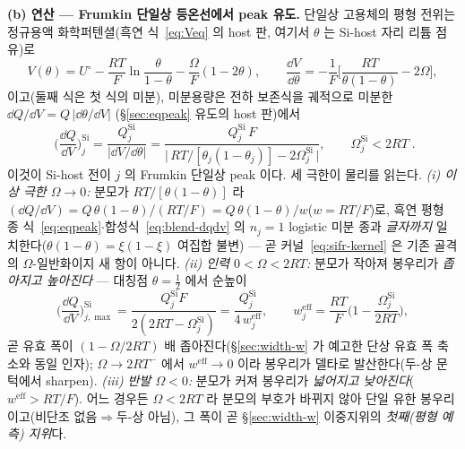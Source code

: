 \textbf{(b) 연산 --- Frumkin 단일상 등온선에서 peak 유도.}
단일상 고용체의 평형 전위는 정규용액 화학퍼텐셜(흑연 식~\eqref{eq:Veq} 의 host 판, 여기서 $\theta$ 는 Si-host
자리 리튬 점유)로
\begin{equation}
V(\theta)=U^{\circ}-\frac{RT}{F}\ln\frac{\theta}{1-\theta}-\frac{\Omega}{F}(1-2\theta),
\qquad
\frac{\dd V}{\dd\theta}=-\frac1F\Big[\frac{RT}{\theta(1-\theta)}-2\Omega\Big],
\label{eq:sifr-Vtheta}
\end{equation}
이고(둘째 식은 첫 식의 미분), 미분용량은 전하 보존식을 궤적으로 미분한 $\dd Q/\dd V=Q\,|\dd\theta/\dd V|$
(\S\ref{sec:eqpeak} 유도의 host 판)에서
\begin{equation}
\boxed{\;\Big(\frac{\dd Q}{\dd V}\Big)^\mathrm{Si}_j
=\frac{Q_j^\mathrm{Si}}{|\dd V/\dd\theta|}
=\frac{Q_j^\mathrm{Si}\,F}{\big|\,RT/[\theta_j(1-\theta_j)]-2\Omega_j^\mathrm{Si}\,\big|},
\qquad \Omega_j^\mathrm{Si}<2RT\;.}
\label{eq:sifr-kernel}
\end{equation}
이것이 Si-host 전이 $j$ 의 Frumkin 단일상 peak 이다. 세 극한이 물리를 읽는다.
\emph{(i) 이상 극한 $\Omega\!\to\!0$:} 분모가 $RT/[\theta(1-\theta)]$ 라
$(\dd Q/\dd V)=Q\,\theta(1-\theta)/(RT/F)=Q\,\theta(1-\theta)/w$($w\!=\!RT/F$)로, 흑연 평형 종
식~\eqref{eq:eqpeak}$\cdot$합성식~\eqref{eq:blend-dqdv} 의 $n_j\!=\!1$ logistic 미분 종과 \emph{글자까지}
일치한다($\theta(1-\theta)=\xi(1-\xi)$ 여집합 불변) --- 곧 커널~\eqref{eq:sifr-kernel} 은 기존 골격의
$\Omega$-일반화이지 새 항이 아니다. \emph{(ii) 인력 $0<\Omega<2RT$:} 분모가 작아져 봉우리가
\emph{좁아지고 높아진다} --- 대칭점 $\theta\!=\!\tfrac12$ 에서 순높이
\begin{equation}
\Big(\frac{\dd Q}{\dd V}\Big)^\mathrm{Si}_{j,\max}
=\frac{Q_j^\mathrm{Si}F}{2(2RT-\Omega_j^\mathrm{Si})}
=\frac{Q_j^\mathrm{Si}}{4\,w_j^\mathrm{eff}},\qquad
w_j^\mathrm{eff}=\frac{RT}{F}\Big(1-\frac{\Omega_j^\mathrm{Si}}{2RT}\Big),
\label{eq:sifr-peakheight}
\end{equation}
곧 유효 폭이 $(1-\Omega/2RT)$ 배 좁아진다(\S\ref{sec:width-w} 가 예고한 단상 유효 폭 축소와 동일 인자);
$\Omega\!\to\!2RT^-$ 에서 $w^\mathrm{eff}\!\to\!0$ 이라 봉우리가 델타로 발산한다(두-상 문턱에서 sharpen).
\emph{(iii) 반발 $\Omega<0$:} 분모가 커져 봉우리가 \emph{넓어지고 낮아진다}($w^\mathrm{eff}>RT/F$). 어느
경우든 $\Omega<2RT$ 라 분모의 부호가 바뀌지 않아 단일 유한 봉우리이고(비단조 없음$\Rightarrow$두-상
아님), 그 폭이 곧 \S\ref{sec:width-w} 이중지위의 \emph{첫째(평형 예측) 지위}다.

